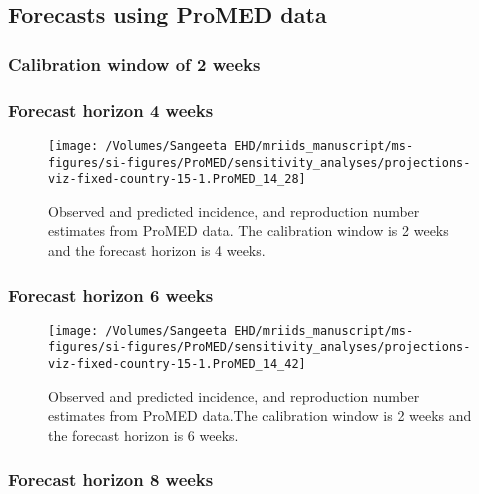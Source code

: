 \documentclass[11pt,]{article}
\begin{document}
\hypertarget{forecasts-using-promed-data-1}{%
  \subsection{Forecasts using ProMED
    data}\label{forecasts-using-promed-data-1}}

\hypertarget{calibration-window-of-2-weeks-3}{%
  \subsubsection{Calibration window of 2
    weeks}\label{calibration-window-of-2-weeks-3}}

\hypertarget{forecast-horizon-4-weeks-8}{%
  \subsubsection{Forecast horizon 4 weeks}\label{forecast-horizon-4-weeks-8}}

\begin{figure}

  {\centering \texttt{[image: /Volumes/Sangeeta EHD/mriids\_manuscript/ms-figures/si-figures/ProMED/sensitivity\_analyses/projections-viz-fixed-country-15-1.ProMED\_14\_28]} 

  }

  \caption{Observed and predicted incidence, and reproduction number
    estimates from ProMED data. The calibration window is 2 weeks and the forecast horizon is 4 weeks.}\label{fig:SI-34}
\end{figure}

\hypertarget{forecast-horizon-6-weeks-9}{%
  \subsubsection{Forecast horizon 6 weeks}\label{forecast-horizon-6-weeks-9}}

\begin{figure}

  {\centering \texttt{[image: /Volumes/Sangeeta EHD/mriids\_manuscript/ms-figures/si-figures/ProMED/sensitivity\_analyses/projections-viz-fixed-country-15-1.ProMED\_14\_42]} 

  }

  \caption{Observed and predicted incidence, and reproduction number
    estimates from ProMED data.The calibration window is 2 weeks and
    the forecast horizon is 6 weeks.}
  \label{fig:SI-35}
\end{figure}

\hypertarget{forecast-horizon-8-weeks-9}{%
  \subsubsection{Forecast horizon 8 weeks}\label{forecast-horizon-8-weeks-9}}
\end{document}
